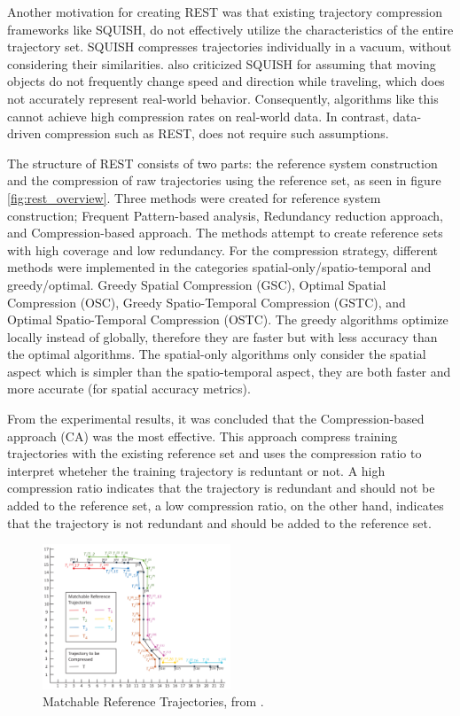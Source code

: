 Another motivation for creating REST was that existing trajectory compression frameworks like SQUISH, do not effectively utilize the characteristics of the entire trajectory set. SQUISH compresses trajectories individually in a vacuum, without considering their similarities. \textcite{zhao2018rest} also criticized SQUISH for assuming that moving objects do not frequently change speed and direction while traveling, which does not accurately represent real-world behavior. Consequently, algorithms like this cannot achieve high compression rates on real-world data. In contrast, data-driven compression such as REST, does not require such assumptions.

The structure of REST consists of two parts: the reference system construction and the compression of raw trajectories using the reference set, as seen in figure \ref*{fig:rest_overview}. Three methods were created for reference system construction; Frequent Pattern-based analysis, Redundancy reduction approach, and Compression-based approach. The methods attempt to create reference sets with high coverage and low redundancy. For the compression strategy, different methods were implemented in the categories spatial-only/spatio-temporal and greedy/optimal. Greedy Spatial Compression (GSC), Optimal Spatial Compression (OSC), Greedy Spatio-Temporal Compression (GSTC), and Optimal Spatio-Temporal Compression (OSTC). The greedy algorithms optimize locally instead of globally, therefore they are faster but with less accuracy than the optimal algorithms. The spatial-only algorithms only consider the spatial aspect which is simpler than the spatio-temporal aspect, they are both faster and more accurate (for spatial accuracy metrics).

From the experimental results, it was concluded that the Compression-based approach (CA) was the most effective. This approach compress training trajectories with the existing reference set and uses the compression ratio to interpret wheteher the training trajectory is reduntant or not. A high compression ratio indicates that the trajectory is redundant and should not be added to the reference set, a low compression ratio, on the other hand, indicates that the trajectory is not redundant and should be added to the reference set.

\begin{figure}
    \includegraphics[width=0.5\textwidth]{./figures/rest.png}
    \caption{Matchable Reference Trajectories, from \cite{zhao2018rest}.}
    \label{fig:rest}
\end{figure}

